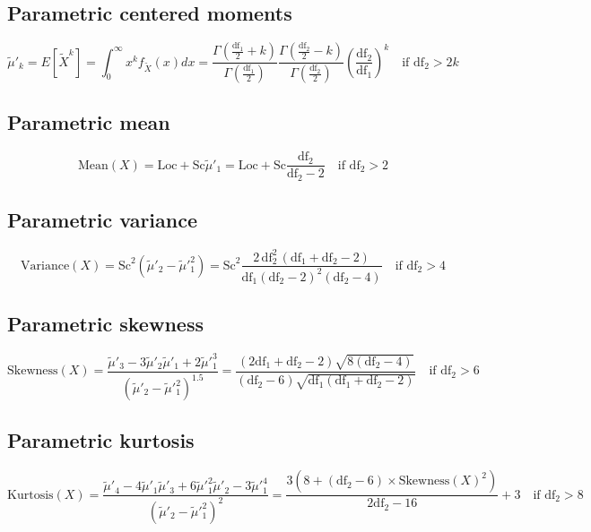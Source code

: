 \documentclass{article}
\begin{document}
\subsection{Parametric centered moments}
\begin{equation*} \tilde{\mu}'_{k}=E[\tilde{X}^k]=\int_{0}^{\infty}x^{k}f_{\tilde{X}}\left(x\right)dx=\frac{\Gamma\left(\tfrac{\text{df}_{1}}{2}+k\right) }{\Gamma\left(\tfrac{\text{df}_{1}}{2}\right)}\frac{\Gamma\left(\tfrac{\text{df}_{2}}{2}-k\right) }{\Gamma\left(\tfrac{\text{df}_{2}}{2}\right) }\left(\frac{\text{df}_{2}}{\text{df}_{1}}\right)^k \quad \text{if }\text{df}_{2} > 2k \end{equation*}
\subsection{Parametric mean}
\begin{equation*} \mathrm{Mean}(X)=\text{Loc}+\text{Sc}\tilde{\mu}'_{1}=\text{Loc}+\text{Sc}\frac{\text{df}_{2}}{\text{df}_{2}-2} \quad \text{if }\text{df}_{2} > 2 \end{equation*}
\subsection{Parametric variance}
\begin{equation*} \mathrm{Variance}(X)=\text{Sc}^{2}(\tilde{\mu}'_{2}-\tilde{\mu}'^{2}_{1})=\text{Sc}^{2}\frac{2\,\text{df}_{2}^2\,(\text{df}_{1}+\text{df}_{2}-2)}{\text{df}_{1} (\text{df}_{2}-2)^2 (\text{df}_{2}-4)} \quad \text{if }\text{df}_{2} > 4 \end{equation*}
\subsection{Parametric skewness}
\begin{equation*} \mathrm{Skewness}(X)=\frac{\tilde{\mu}'_{3}-3\tilde{\mu}'_{2}\tilde{\mu}'_{1}+2\tilde{\mu}'^{3}_{1}}{(\tilde{\mu}'_{2}-\tilde{\mu}'^{2}_{1})^{1.5}}=\frac{(2 \text{df}_{1}+\text{df}_{2}-2) \sqrt{8 (\text{df}_{2}-4)}}{(\text{df}_{2}-6) \sqrt{\text{df}_{1} (\text{df}_{1}+\text{df}_{2} -2)}}\quad \text{if }\text{df}_{2} > 6 \end{equation*}
\subsection{Parametric kurtosis}
\begin{equation*} \mathrm{Kurtosis}(X)=\frac{\tilde{\mu}'_{4}-4\tilde{\mu}'_{1}\tilde{\mu}'_{3}+6\tilde{\mu}'^{2}_{1}\tilde{\mu}'_{2}-3\tilde{\mu}'^{4}_{1}}{(\tilde{\mu}'_{2}-\tilde{\mu}'^{2}_{1})^{2}}=\frac{3\left(8+\left(\text{df}_{2}-6\right)\times \mathrm{Skewness}(X)^{2}\right)}{2\text{df}_{2}-16}+3\quad \text{if }\text{df}_{2} > 8 \end{equation*}
\end{document}
